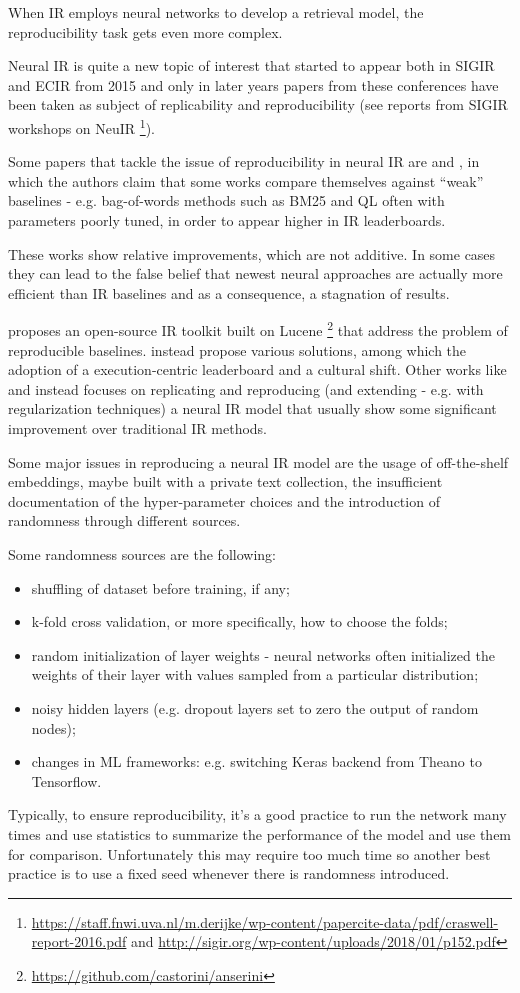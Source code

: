 When IR employs neural networks to develop a retrieval model, the reproducibility task gets even more complex.

Neural IR is quite a new topic of interest that started to appear both in SIGIR and ECIR from 2015 and only in later years papers from these conferences have been taken as subject of replicability and reproducibility (see reports from SIGIR workshops on NeuIR \footnote{\url{https://staff.fnwi.uva.nl/m.derijke/wp-content/papercite-data/pdf/craswell-report-2016.pdf} and \url{http://sigir.org/wp-content/uploads/2018/01/p152.pdf}}).

Some papers that tackle the issue of reproducibility in neural IR are \cite{neurhype} and \cite{anserini}, in which the authors claim that some works compare themselves against ``weak'' baselines - e.g. bag-of-words methods such as BM25 and QL often with parameters poorly tuned, in order to appear higher in IR leaderboards.

These works show relative improvements, which are not additive. In some cases they can lead to the false belief that newest neural approaches are actually more efficient than IR baselines and as a consequence, a stagnation of results.

\cite{anserini} proposes an open-source IR toolkit built on Lucene \footnote{\url{https://github.com/castorini/anserini}} that address the problem of reproducible baselines. \cite{neurhype} instead propose various solutions, among which the adoption of a execution-centric leaderboard and a cultural shift. Other works like \cite{reproconvneurir} and \cite{axiomneuir} instead focuses on replicating and reproducing (and extending - e.g. with regularization techniques) a neural IR model that usually show some significant improvement over traditional IR methods.

Some major issues in reproducing a neural IR model are the usage of off-the-shelf embeddings, maybe built with a private text collection, the insufficient documentation of the hyper-parameter choices and the introduction of randomness through different sources.

Some randomness sources are the following:

\begin{itemize}
\item shuffling of dataset before training, if any;
\item k-fold cross validation, or more specifically, how to choose the folds;
\item random initialization of layer weights - neural networks often initialized the weights of their
layer with values sampled from a particular distribution;
\item noisy hidden layers (e.g. dropout layers set to zero the output of random nodes);
\item changes in ML frameworks: e.g. switching Keras backend from Theano to Tensorflow.
\end{itemize}

Typically, to ensure reproducibility, it's a good practice to run the network many times and use statistics to summarize the performance of the model and use them for comparison. Unfortunately this may require too much time so another best practice is to use a fixed seed whenever there is randomness introduced.
